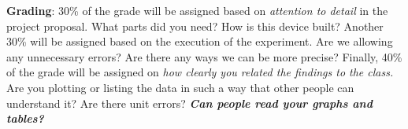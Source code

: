 \documentclass[10pt]{article}
\begin{document}
\textbf{Grading}: 30\% of the grade will be assigned based on \textit{attention to detail} in the project proposal.  What parts did you need? How is this device built?  Another 30\% will be assigned based on the execution of the experiment.  Are we allowing any unnecessary errors?  Are there any ways we can be more precise?  Finally, 40\% of the grade will be assigned on \textit{how clearly you related the findings to the class.}  Are you plotting or listing the data in such a way that other people can understand it?  Are there unit errors?  \textbf{\textit{Can people read your graphs and tables?}}
\end{document}
